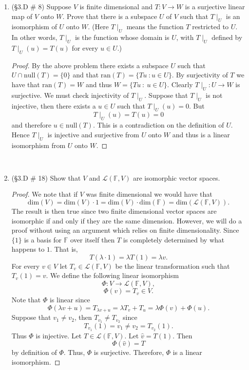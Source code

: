 \documentclass[12pt,letterpaper]{article}
\theoremstyle{plain}
\theoremstyle{definition}
\begin{document}
\begin{enumerate}[1.]
\begin{proof}
\[v=a_1v_1+\ldots+a_pv_p+b_1u_1+\ldots+b_nu_n.\]
Thus 
\[Tv=a_1Tv_1+\ldots+a_pTv_p+b_1Tu_1+\ldots +b_n Tu_n=0+b_1Tu_1+\ldots +b_n Tu_n=T(b_1u_1+\ldots b_nu_n).\]
Clearly, $\text{ran}(T)=\{Tu\ :\ u\in U\}$.
\end{proof}
\ \\
\item (\S 3.D \# 8) Suppose $V$ is finite dimensional and $T:V\rightarrow W$ is a surjective linear map of $V$ onto $W$. Prove that there is a subspace $U$ of $V$ such that $T\mid_U$ is an isomorphism of $U$ onto $W$. (Here $T\mid_U$ means the function $T$ restricted to $U$. In other words, $T\mid_U$ is the function whose domain is $U$, with $T\mid_U$ defined by $T\mid_U(u)=T(u)$ for every $u\in U$.)
\begin{proof} By the above problem there exists a subspace $U$ such that $U\cap \text{null}(T)=\{0\}$ and that $\text{ran}(T)=\{Tu\ : u\in U\}$. By surjectivity of $T$ we have that $\text{ran}(T)=W$ and thus $W=\{Tu\ :\ u\in U\}$. Clearly $T\mid_U:U\rightarrow W$ is surjective. We must check injectivity of $T\mid_U$. Suppose that $T\mid_U$ is not injective, then there exists a $u\in U$ such that $T\mid_U(u)=0$. But 
\[T\mid_U(u)=T(u)=0\]
and therefore $u\in \text{null}(T)$. This is a contradiction on the definition of $U$.  Hence $T\mid_U$ is injective and surjective from $U$ onto $W$ and thus is a linear isomorphism from $U$ onto $W$. 
\end{proof}
\ \\
\item (\S 3.D \# 18) Show that $V$ and $\mathcal{L}(\mathbb{F},V)$ are isomorphic vector spaces. 
\begin{proof} We note that if $V$ was finite dimensional we would have that 
\[\text{dim}(V)=\text{dim}(V)\cdot 1 =\text{dim}(V)\cdot \text{dim}(\mathbb{F})=\text{dim}(\mathcal{L}(\mathbb{F},V)).\]
The result is then true since two finite dimensional vector spaces are isomorphic if and only if they are the same dimension.
However, we will do a proof without using an argument which relies on finite dimensionality. Since $\{1\}$ is a basis for $\mathbb{F}$ over itself then $T$ is completely determined by what happens to $1$. That is, 
\[T(\lambda \cdot 1)=\lambda T(1)=\lambda v.\] For every $v\in V$ let $T_v\in \mathcal{L}(\mathbb{F},V)$ be the linear transformation such that $T_v(1)=v$. We define the following linear isomorphism 
\[\Phi: V\rightarrow \mathcal{L}(\mathbb{F},V),\]
\[\Phi(v)=T_v\in V.\]
Note that $\Phi$ is linear since 
\[\Phi(\lambda v+u)=T_{\lambda v+u}=\lambda T_v+T_u=\lambda \Phi(v)+\Phi(u).\]
Suppose that $v_1\neq v_2$, then $T_{v_1}\neq T_{v_2}$ since 
\[T_{v_1}(1)=v_1\neq v_2=T_{v_2}(1).\]
Thus $\Phi$ is injective. Let $T\in \mathcal{L}(\mathbb{F},V)$. Let $\hat{v}=T(1)$. Then 
\[\Phi(\hat{v})=T\] by definition of $\Phi$. Thus, $\Phi$ is surjective. Therefore, $\Phi$ is a linear isomorphism. 
\end{proof}
\end{enumerate}
\end{document}
